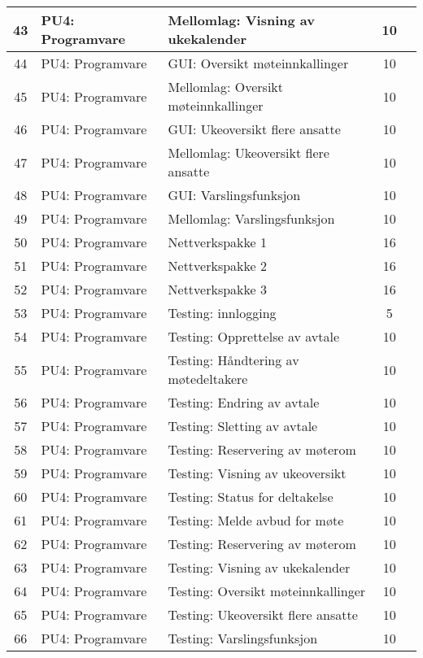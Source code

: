 \begin{table}
{\begin{tabularx}{1.3\textwidth}{|c|l|X|c|c|}
	43 & PU4: Programvare & Mellomlag: Visning av ukekalender  & 10 & \\ \hline
	44 & PU4: Programvare & GUI: Oversikt møteinnkallinger & 10 & \\ \hline
	45 & PU4: Programvare & Mellomlag: Oversikt møteinnkallinger  & 10 & \\ \hline
	46 & PU4: Programvare & GUI: Ukeoversikt flere ansatte & 10 & \\ \hline
	47 & PU4: Programvare & Mellomlag: Ukeoversikt flere ansatte  & 10 & \\ \hline
	48 & PU4: Programvare & GUI: Varslingsfunksjon & 10 & \\ \hline
	49 & PU4: Programvare & Mellomlag: Varslingsfunksjon & 10 & \\ \hline
	50 & PU4: Programvare & Nettverkspakke 1 & 16 & \\ \hline
	51 & PU4: Programvare & Nettverkspakke 2 & 16 & \\ \hline
	52 & PU4: Programvare & Nettverkspakke 3 & 16 & \\ \hline
	53 & PU4: Programvare & Testing: innlogging & 5 & \\ \hline
	54 & PU4: Programvare & Testing: Opprettelse av avtale & 10 & \\ \hline
	55 & PU4: Programvare & Testing: Håndtering av møtedeltakere & 10 & \\ \hline
	56 & PU4: Programvare & Testing: Endring av avtale & 10 & \\  \hline
	57 & PU4: Programvare & Testing: Sletting av avtale & 10 & \\ \hline
	58 & PU4: Programvare & Testing: Reservering av møterom & 10 & \\ \hline
	59 & PU4: Programvare & Testing: Visning av ukeoversikt & 10 & \\ \hline
	60 & PU4: Programvare & Testing: Status for deltakelse & 10 & \\ \hline
	61 & PU4: Programvare & Testing: Melde avbud for møte & 10 & \\ \hline
	62 & PU4: Programvare & Testing: Reservering av møterom & 10 & \\ \hline
	63 & PU4: Programvare & Testing: Visning av ukekalender & 10 & \\ \hline
	64 & PU4: Programvare & Testing: Oversikt møteinnkallinger & 10 & \\ \hline
	65 & PU4: Programvare & Testing: Ukeoversikt flere ansatte & 10 & \\ \hline
	66 & PU4: Programvare & Testing: Varslingsfunksjon & 10 & \\ \hline

\end{tabularx}}
\end{table}
